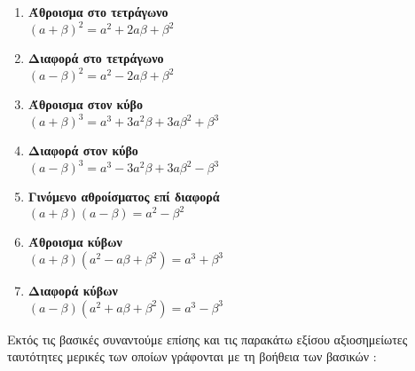 \documentclass[twoside,10pt]{book}
\begin{document}
\begin{multicols}{2}
\begin{enumerate}[itemsep=0mm,label=\bf\arabic*.]
\item \parbox[t]{4cm}{\textbf{Άθροισμα στο τετράγωνο}\\$ (a+\beta)^2=a^2+2a\beta+\beta^2 $}
\item \parbox[t]{4cm}{\textbf{Διαφορά στο τετράγωνο}\\$ (a-\beta)^2=a^2-2a\beta+\beta^2 $}
\item \parbox[t]{5cm}{\textbf{Άθροισμα στον κύβο}\\$ (a+\beta)^3=a^3+3a^2\beta+3a\beta^2+\beta^3 $}
\item \parbox[t]{5cm}{\textbf{Διαφορά στον κύβο}\\$ (a-\beta)^3=a^3-3a^2\beta+3a\beta^2-\beta^3 $}
\item \parbox[t]{6cm}{\textbf{Γινόμενο αθροίσματος επί διαφορά}\\$ (a+\beta)(a-\beta)=a^2-\beta^2 $}
\item \parbox[t]{5cm}{\textbf{Άθροισμα κύβων}\\$ (a+\beta)\left(a^2-a\beta+\beta^2 \right)=a^3+\beta^3 $}
\item \parbox[t]{5cm}{\textbf{Διαφορά κύβων}\\$ (a-\beta)\left(a^2+a\beta+\beta^2 \right)=a^3-\beta^3 $}
\end{enumerate}
\end{multicols}
Εκτός τις βασικές συναντούμε επίσης και τις παρακάτω εξίσου αξιοσημείωτες ταυτότητες μερικές των οποίων γράφονται με τη βοήθεια των βασικών :
\end{document}
